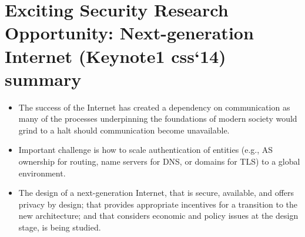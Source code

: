 \documentclass[14pt]{article}
\begin{document}
	\section{Exciting Security Research Opportunity: Next-generation Internet (Keynote1 css`14) summary}
	\begin{itemize}
	\item The success of the Internet has created a dependency on communication as many of the processes underpinning the foundations of modern society would grind to a halt should communication become unavailable.
	\item Important challenge is how to scale authentication of entities (e.g., AS ownership for routing, name servers for DNS, or domains for TLS) to a global environment.
	\item The design of a next-generation Internet, that is secure, available, and offers privacy by design; that provides appropriate incentives for a transition to the new architecture; and that considers economic and policy issues at the design stage, is being studied.
	\end{itemize}
\end{document}
